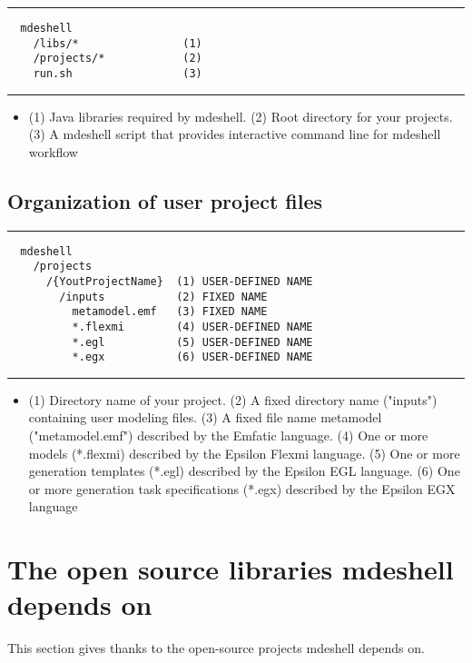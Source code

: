\documentclass[12pt]{article}
\begin{document}
\noindent\rule{8cm}{0.4pt}
\begin{lstlisting}
  mdeshell
    /libs/*                (1)
    /projects/*            (2)
    run.sh                 (3)
\end{lstlisting}
\noindent\rule{8cm}{0.4pt}

\begin{itemize}[label={}]
\itemsep0em
  \item (1) Java libraries required by mdeshell. (2) Root directory for your projects. (3) A mdeshell script that provides interactive command line for mdeshell workflow
\end{itemize} 

\subsection*{Organization of user project files}

\noindent\rule{8cm}{0.4pt}
\begin{lstlisting}
  mdeshell
    /projects
      /{YoutProjectName}  (1) USER-DEFINED NAME
        /inputs           (2) FIXED NAME
          metamodel.emf   (3) FIXED NAME
          *.flexmi        (4) USER-DEFINED NAME
          *.egl           (5) USER-DEFINED NAME
          *.egx           (6) USER-DEFINED NAME
\end{lstlisting}
\noindent\rule{8cm}{0.4pt}

\begin{itemize}[label={}]
\itemsep0em
  \item (1) Directory name of your project. (2) A fixed directory name ("inputs") containing user modeling files. (3) A fixed file name metamodel ("metamodel.emf") described by the Emfatic language. (4) One or more models (*.flexmi) described by the Epsilon Flexmi language. (5) One or more generation templates (*.egl) described by the Epsilon EGL language. (6) One or more generation task specifications (*.egx) described by the Epsilon EGX language
\end{itemize} 



\pagebreak 
\section*{The open source libraries mdeshell depends on}

This section gives thanks to the open-source projects mdeshell depends on. 
\end{document}
